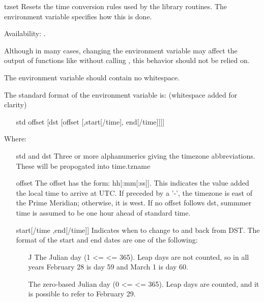 \begin{funcdesc}{tzset}{}
Resets the time conversion rules used by the library routines.
The environment variable  specifies how this is done.

Availability: \UNIX.

\begin{notice}
Although in many cases, changing the  environment variable
may affect the output of functions like  without calling 
, this behavior should not be relied on.

The  environment variable should contain no whitespace.
\end{notice}

The standard format of the  environment variable is:
(whitespace added for clarity)
\begin{itemize}
    \item[std offset [dst [offset] [,start[/time], end[/time]]]]
\end{itemize}

Where:

\begin{itemize}
  \item[std and dst]
    Three or more alphanumerics giving the timezone abbreviations.
    These will be propogated into time.tzname

  \item[offset]
    The offset has the form: \plusminus{} hh[:mm[:ss]].
    This indicates the value added the local time to arrive at UTC. 
    If preceded by a '-', the timezone is east of the Prime 
    Meridian; otherwise, it is west. If no offset follows
    dst, summmer time is assumed to be one hour ahead of standard time.

  \item[start[/time],end[/time]]
    Indicates when to change to and back from DST. The format of the
    start and end dates are one of the following:

    \begin{itemize}
      \item[J\var{n}]
        The Julian day  (1 <=  <= 365). Leap days are not 
        counted, so in all years February 28 is day 59 and
        March 1 is day 60.

    \item[\var{n}]
        The zero-based Julian day (0 <=  <= 365). Leap days are
        counted, and it is possible to refer to February 29.


\end{itemize}
\end{itemize}
\end{funcdesc}
